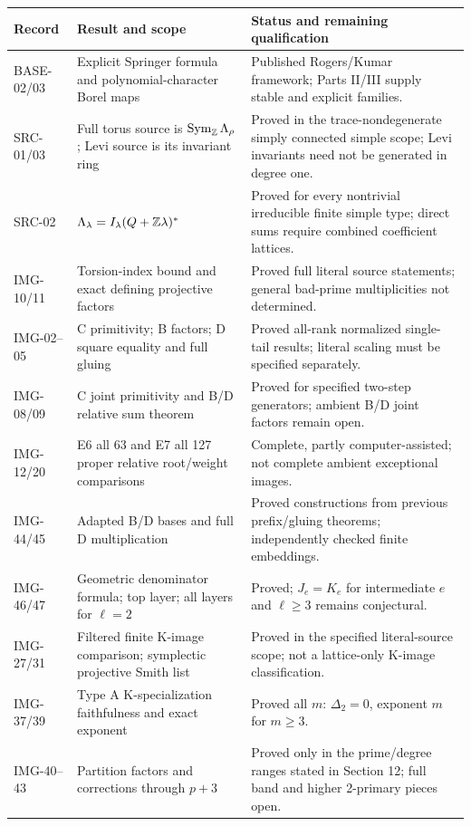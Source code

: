 \small
\begin{longtable}{>{\raggedright\arraybackslash}p{}>{\raggedright\arraybackslash}p{}>{\raggedright\arraybackslash}p{}}
\toprule
Record & Result and scope & Status and remaining qualification\\\midrule\endhead
BASE-02/03 & Explicit Springer formula and polynomial-character Borel maps & Published Rogers/Kumar framework; Parts II/III supply stable and explicit families.\\
SRC-01/03 & Full torus source is $\operatorname{Sym}_\mathbb Z\Lambda_\rho$; Levi source is its invariant ring & Proved in the trace-nondegenerate simply connected simple scope; Levi invariants need not be generated in degree one.\\
SRC-02 & $\Lambda_\lambda=I_\lambda(Q+\mathbb Z\lambda)^*$ & Proved for every nontrivial irreducible finite simple type; direct sums require combined coefficient lattices.\\
IMG-10/11 & Torsion-index bound and exact defining projective factors & Proved full literal source statements; general bad-prime multiplicities not determined.\\
IMG-02--05 & C primitivity; B factors; D square equality and full gluing & Proved all-rank normalized single-tail results; literal scaling must be specified separately.\\
IMG-08/09 & C joint primitivity and B/D relative sum theorem & Proved for specified two-step generators; ambient B/D joint factors remain open.\\
IMG-12/20 & E6 all 63 and E7 all 127 proper relative root/weight comparisons & Complete, partly computer-assisted; not complete ambient exceptional images.\\
IMG-44/45 & Adapted B/D bases and full D multiplication & Proved constructions from previous prefix/gluing theorems; independently checked finite embeddings.\\
IMG-46/47 & Geometric denominator formula; top layer; all layers for $\ell=2$ & Proved; $J_e=K_e$ for intermediate $e$ and $\ell\ge3$ remains conjectural.\\
IMG-27/31 & Filtered finite K-image comparison; symplectic projective Smith list & Proved in the specified literal-source scope; not a lattice-only K-image classification.\\
IMG-37/39 & Type A K-specialization faithfulness and exact exponent & Proved all $m$: $\Delta_2=0$, exponent $m$ for $m\ge3$.\\
IMG-40--43 & Partition factors and corrections through $p+3$ & Proved only in the prime/degree ranges stated in Section 12; full band and higher 2-primary pieces open.\\

\end{longtable}
